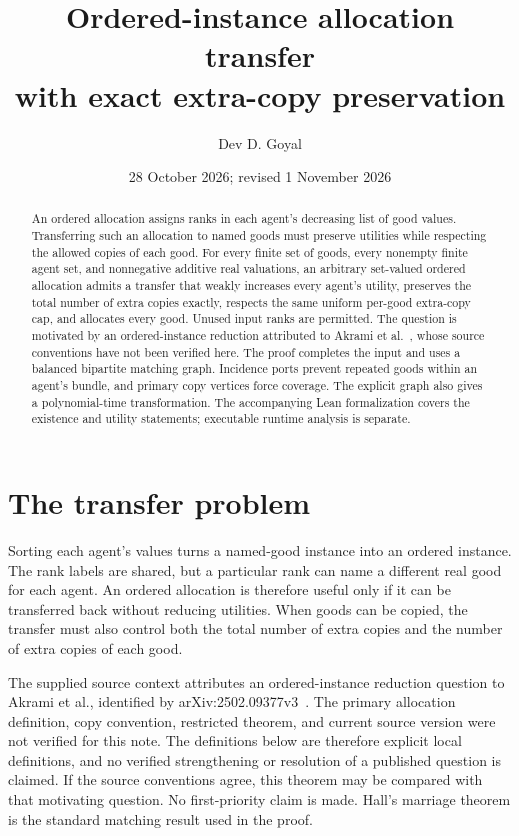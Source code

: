 \documentclass[11pt,a4paper]{article}
\title{Ordered-instance allocation transfer\\with exact extra-copy preservation}
\author{Dev D. Goyal}
\date{28 October 2026; revised 1 November 2026}
\begin{document}
\maketitle

\begin{abstract}
An ordered allocation assigns ranks in each agent's decreasing list of good
values. Transferring such an allocation to named goods must preserve utilities
while respecting the allowed copies of each good. For every finite set of
goods, every nonempty finite agent set, and nonnegative additive real
valuations, an arbitrary set-valued ordered allocation admits a transfer
that weakly increases every agent's utility, preserves the total number of
extra copies exactly, respects the same uniform per-good extra-copy cap,
and allocates every good. Unused input ranks are permitted. The question
is motivated by an ordered-instance reduction attributed to Akrami
et al.~\cite{Akrami}, whose source conventions have not been verified
here. The proof
completes the input and uses a balanced bipartite matching graph. Incidence
ports prevent repeated goods within an agent's bundle, and primary copy
vertices force coverage. The explicit graph also gives a polynomial-time
transformation. The accompanying Lean formalization covers the existence
and utility statements; executable runtime analysis is separate.
\end{abstract}

\section{The transfer problem}
Sorting each agent's values turns a named-good instance into an ordered
instance. The rank labels are shared, but a particular rank can name a
different real good for each agent. An ordered allocation is therefore
useful only if it can be transferred back without reducing utilities.
When goods can be copied, the transfer must also control both the total
number of extra copies and the number of extra copies of each good.

The supplied source context attributes an ordered-instance reduction question
to Akrami et al., identified by arXiv:2502.09377v3~\cite{Akrami}.
The primary allocation definition, copy convention, restricted theorem,
and current source version were not verified for this note. The definitions
below are therefore explicit local definitions, and no verified strengthening
or resolution of a published question is claimed. If the source conventions
agree, this theorem may be compared with that motivating question.
No first-priority claim is made. Hall's marriage theorem is the standard
matching result used in the proof.
\end{document}
